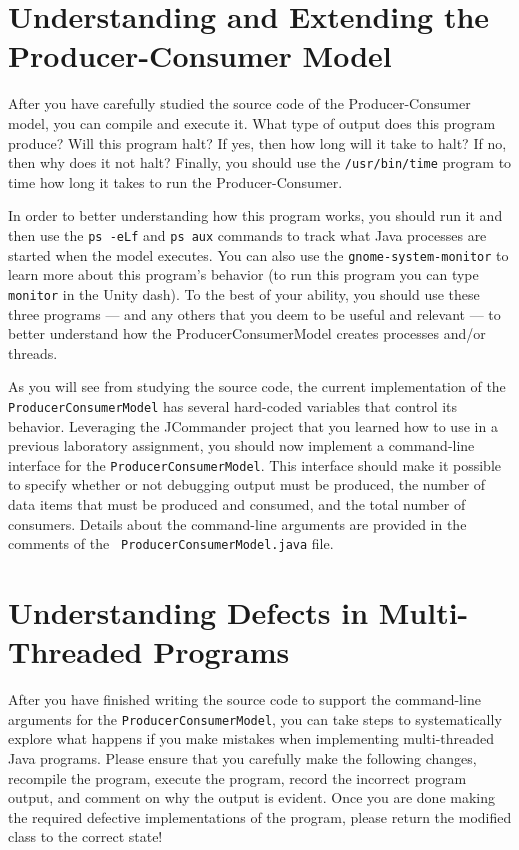 \section*{Understanding and Extending the Producer-Consumer Model}

After you have carefully studied the source code of the Producer-Consumer model, you can compile and execute it.  What type of
output does this program produce?  Will this program halt?  If yes, then how long will it take to halt?  If no, then why does it
not halt? Finally, you should use the {\tt /usr/bin/time} program to time how long it takes to run the Producer-Consumer.

In order to better understanding how this program works, you should run it and then use the {\tt ps -eLf} and {\tt ps aux}
commands to track what Java processes are started when the model executes. You can also use the {\tt gnome-system-monitor} to
learn more about this program's behavior (to run this program you can type {\tt monitor} in the Unity dash).  To the best of your
ability, you should use these three programs --- and any others that you deem to be useful and relevant --- to better understand
how the ProducerConsumerModel creates processes and/or threads.

As you will see from studying the source code, the current implementation of the {\tt ProducerConsumerModel} has several hard-coded
variables that control its behavior. Leveraging the JCommander project that you learned how to use in a previous laboratory
assignment, you should now implement a command-line interface for the {\tt ProducerConsumerModel}.  This interface should make it
possible to specify whether or not debugging output must be produced, the number of data items that must be produced and consumed,
and the total number of consumers.  Details about the command-line arguments are provided in the comments of the {\tt
ProducerConsumerModel.java} file. 

\section*{Understanding Defects in Multi-Threaded Programs}

  After you have finished writing the source code to support the command-line arguments for the {\tt ProducerConsumerModel}, you
  can take steps to systematically explore what happens if you make mistakes when implementing multi-threaded Java programs.
  Please ensure that you carefully make the following changes, recompile the program, execute the program, record the incorrect
  program output, and comment on why the output is evident.  Once you are done making the required defective implementations of
  the program, please return the modified class to the correct state!

